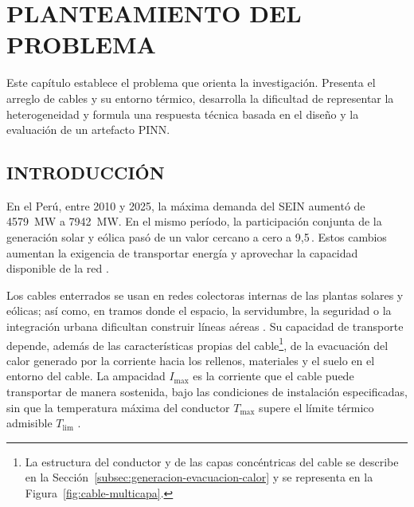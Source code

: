 \documentclass[11pt,a4paper,oneside]{report}
\newcommand{\tesisbodyfont}{\fontsize{11}{13.6}\selectfont}
\newcommand{\Tmax}{T_{\max}}
\newcommand{\Imax}{I_{\max}}
\newcommand{\pct}{\mbox{\char37}}
\begin{document}
\begingroup
\singlespacing
\tesisbodyfont
\tableofcontents
\listoffigures
\listoftables
\listofformulas
\listofprocedures
\endgroup

\clearpage
{}

\chapter{PLANTEAMIENTO DEL PROBLEMA}
\thispagestyle{empty}

Este capítulo establece el problema que orienta la investigación. Presenta el arreglo de cables y su entorno térmico, desarrolla la dificultad de representar la heterogeneidad y formula una respuesta técnica basada en el diseño y la evaluación de un artefacto PINN.

\section{INTRODUCCIÓN}

En el Perú, entre 2010 y 2025, la máxima demanda del SEIN aumentó de \SI{4579}{\mega\watt} a \SI{7942}{\mega\watt}. En el mismo período, la participación conjunta de la generación solar y eólica pasó de un valor cercano a cero a 9,5\,\pct{}. Estos cambios aumentan la exigencia de transportar energía y aprovechar la capacidad disponible de la red \parencites{minem2025anuario2024}{minem2025indicadoresDiciembre}{coesMaximaDemanda}{iea2025transmissiongrid}.

Los cables enterrados se usan en redes colectoras internas de las plantas solares y eólicas; así como, en tramos donde el espacio, la servidumbre, la seguridad o la integración urbana dificultan construir líneas aéreas \parencite{cigre2023overheadLines}. Su capacidad de transporte depende, además de las características propias del cable\footnote{La estructura del conductor y de las capas concéntricas del cable se describe en la Sección~\ref{subsec:generacion-evacuacion-calor} y se representa en la Figura~\ref{fig:cable-multicapa}.}, de la evacuación del calor generado por la corriente hacia los rellenos, materiales y el suelo en el entorno del cable. La ampacidad \(\Imax\) es la corriente que el cable puede transportar de manera sostenida, bajo las condiciones de instalación especificadas, sin que la temperatura máxima del conductor \(\Tmax\) supere el límite térmico admisible \(T_{\mathrm{lim}}\) \parencites[cláusulas~4--5]{iec60287}[3--5]{enescu2020}.
\end{document}
